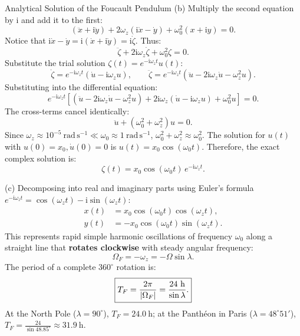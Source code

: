 \begin{workedexample}{Analytical Solution of the Foucault Pendulum}
(b) Multiply the second equation by $\mathrm{i}$ and add it to the first:
\[
(\ddot{x} + \mathrm{i}\ddot{y}) + 2\omega_z(\mathrm{i}\dot{x} - \dot{y}) + \omega_0^2(x + \mathrm{i}y) = 0.
\]
Notice that $\mathrm{i}\dot{x} - \dot{y} = \mathrm{i}(\dot{x} + \mathrm{i}\dot{y}) = \mathrm{i}\dot{\zeta}$.
Thus:
\[
\boxed{\ddot{\zeta} + 2\mathrm{i}\omega_z\dot{\zeta} + \omega_0^2\zeta = 0.}
\]
Substitute the trial solution $\zeta(t) = e^{-\mathrm{i}\omega_z t} u(t)$:
\[
\dot{\zeta} = e^{-\mathrm{i}\omega_z t}(\dot{u} - \mathrm{i}\omega_z u), \qquad \ddot{\zeta} = e^{-\mathrm{i}\omega_z t}(\ddot{u} - 2\mathrm{i}\omega_z\dot{u} - \omega_z^2 u).
\]
Substituting into the differential equation:
\[
e^{-\mathrm{i}\omega_z t}\left[ (\ddot{u} - 2\mathrm{i}\omega_z\dot{u} - \omega_z^2 u) + 2\mathrm{i}\omega_z(\dot{u} - \mathrm{i}\omega_z u) + \omega_0^2 u \right] = 0.
\]
The cross-terms cancel identically:
\[
\ddot{u} + (\omega_0^2 + \omega_z^2)u = 0.
\]
Since $\omega_z \approx 10^{-5}\ \mathrm{rad\,s^{-1}} \ll \omega_0 \approx 1\ \mathrm{rad\,s^{-1}}$, $\omega_0^2 + \omega_z^2 \approx \omega_0^2$.
The solution for $u(t)$ with $u(0) = x_0, \dot{u}(0) = 0$ is $u(t) = x_0\cos(\omega_0 t)$.
Therefore, the exact complex solution is:
\[
\boxed{\zeta(t) = x_0\cos(\omega_0 t)\,e^{-\mathrm{i}\omega_z t}.}
\]

(c) Decomposing into real and imaginary parts using Euler's formula $e^{-\mathrm{i}\omega_z t} = \cos(\omega_z t) - \mathrm{i}\sin(\omega_z t)$:
\begin{align*}
x(t) &= x_0\cos(\omega_0 t)\cos(\omega_z t), \\
y(t) &= -x_0\cos(\omega_0 t)\sin(\omega_z t).
\end{align*}
This represents rapid simple harmonic oscillations of frequency $\omega_0$ along a straight line that \textbf{rotates clockwise} with steady angular frequency:
\[
\boxed{\Omega_F = -\omega_z = -\Omega\sin\lambda.}
\]
The period of a complete $360^\circ$ rotation is:
\[
\boxed{T_F = \frac{2\pi}{\abs{\Omega_F}} = \frac{24\ \mathrm{h}}{\sin\lambda}.}
\]
At the North Pole ($\lambda = 90^\circ$), $T_F = 24.0\ \mathrm{h}$; at the Panthéon in Paris ($\lambda = 48^\circ 51'$), $T_F = \frac{24}{\sin 48.85^\circ} \approx \mathbf{31.9\ \mathrm{h}}$.
\end{workedexample}
